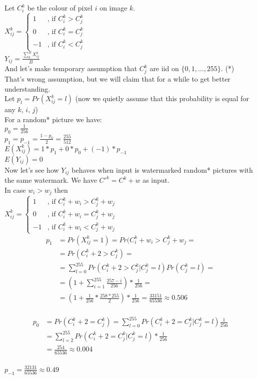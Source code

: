\documentclass[varwidth]{standalone}
\begin{document}
Let $C^k_i$ be the colour of pixel $i$ on image $k$.\\
$X^k_{ij} =
\left\{
\begin{matrix}
1 & \text{, if } C^k_i > C^k_j\\
0 & \text{, if } C^k_i = C^k_j\\
-1 & \text{, if } C^k_i < C^k_j
\end{matrix}\right.$\\
$Y_{ij} = \frac{\sum^B_k X^k_{ij}}{B}$\\
And let's make temporary assumption that $C^k_j$ are iid on $\{0, 1, ..., 255\}$. (*)\\
That's wrong assumption, but we will claim that for a while to get better understanding.\\
Let $p_l = Pr(X^k_{ij} = l)$
(now we quietly assume that this probability is equal for any $k$, $i$, $j$)\\
For a random* picture we have:\\
$p_0 = \frac{1}{256}$\\
$p_1 = p_{-1} = \frac{1-p_0}{2} = \frac{255}{512}$\\
$E(X^k_{ij}) = 1*p_1 + 0*p_0 + (-1)*p_{-1}$\\
$E(Y_{ij}) = 0$\\
Now let's see how $Y_{ij}$ behaves when input is watermarked random* pictures with the same watermark. We have $C'^k = C^k + w$ as input.\\
In case $w_i > w_j$ then\\
$X^k_{ij} =
\left\{
\begin{matrix}
1 & \text{, if } C^k_i + w_i > C^k_j + w_j\\
0 & \text{, if } C^k_i + w_i = C^k_j + w_j\\
-1 & \text{, if } C^k_i + w_i < C^k_j + w_j
\end{matrix}\right.$\\
\begin{align*}
p_1 &= Pr(X^k_{ij} = 1) = Pr(C^k_i + w_i > C^k_j + w_j =\\
    &= Pr(C^k_i + 2 > C^k_j) =\\
    &= \sum_{l=0}^{255} Pr(C^k_i + 2 > C^k_j | C^k_j = l)Pr(C^k_j = l) =\\
    &= (1 + \sum_{i=1}^{255} \frac{257-i}{256})*\frac{1}{256} =\\
    &= (1 + \frac{1}{256}*\frac{258*255}{2})*\frac{1}{256}=\frac{33151}{65536}
        \approx 0.506
\end{align*}\\
\begin{align*}
p_0 &= Pr(C^k_i + 2 = C^k_j) = \sum_{l=0}^{255} Pr(C^k_i + 2 = C^k_j | C^k_j = l)\frac{1}{256}\\
    &= \sum_{l=2}^{255} Pr(C^k_i + 2 = C^k_j | C^k_j = l)*\frac{1}{256}\\
    &= \frac{254}{65536} \approx 0.004
\end{align*}\\
$p_{-1} = \frac{32131}{65536} \approx 0.49$
\end{document}
